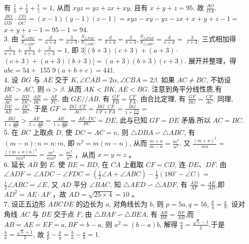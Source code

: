 \documentclass[10pt]{article}
\begin{document}
有 $\frac{1}{x}+\frac{1}{y}+\frac{1}{z}=1$, 从而 $x y z=y z+z x+x y$, 且有 $x+y+z=95$. 故 $\frac{A O}{O A}$. $\frac{B O}{O B^{\prime}} \cdot \frac{C O}{O C^{\prime}}=(x-1)(y-1)(z-1)=x y z-x y-y z-z x+x+y+z-1=$ $x+y+z-1=95-1=94$.\\
3. 由 $\frac{S_{\triangle P B C}}{S_{\triangle A B C}}=\frac{d}{a+d}=\frac{3}{a+3}, \frac{S_{\triangle P A C}}{S_{\triangle A B C}}=\frac{d}{b+d}=\frac{3}{b+3}, \frac{S_{\triangle P A B}}{S_{\triangle A B C}}=\frac{d}{c+d}=$ $\frac{3}{c+3}$. 三式相加得 $\frac{3}{a+3}+\frac{3}{b+3}+\frac{3}{c+3}=1$, 即 $3[(b+3)(c+3)+(a+3) \cdot$ $(c+3)+(a+3)(b+3)]=(a+3)(b+3)(c+3)$. 展开并整理，得 $a b c=54+$ 155 $9(a+b+c)=441$.\\
4. 设 $B G$ 与 $A E$ 交于 $K, \angle C A B=2 \alpha, \angle C B A=2 \beta$. 如果 $A C \neq B C$, 不妨设 $B C>A C$, 则 $\alpha>\beta$. 从而 $A K<B K, A E<B G$. 注意到角平分线性质,有 $\frac{A B}{A C}=\frac{B D}{D C}, \frac{A B}{B C}=\frac{A F}{F C}$. 由 $G E / / A B$, 有 $\frac{G F}{F B}=\frac{C F}{F A}$, 由合比定理, 有 $\frac{G F}{B G}=\frac{C F}{A C}$. 同理, $\frac{D E}{A E}=\frac{D C}{B C}$. 于是 $G F=\frac{B G \cdot C F}{A C}=\frac{B G \cdot C F}{C F+F A}=\frac{B G}{1+\frac{F A}{C F}}=$ $\frac{B G}{1+\frac{A B}{B C}}>\frac{A E}{1+\frac{A B}{A C}}=\frac{A E}{1+\frac{B D}{D C}}=\frac{A E \cdot D C}{B C}=D E$, 此与已知 $G F=D E$ 矛盾.所以 $A C=B C$.\\
5. 在 $B C$ 上取点 $D$, 使 $D C=A C=n$, 则 $\triangle D B A \backsim \triangle A B C$, 有 $(m-n): n=n: m$, 即 $n^{2}=m(m-n)$, 从而 $\frac{m+n}{m-n}=\frac{m^{3}}{n^{3}}$. 又 $\frac{(m+n)^{2}}{m n}=$ $\frac{[(m+n) n]^{2}}{m n^{3}}=\frac{m^{4}}{m n^{3}}=\frac{m^{3}}{n^{3}}$ ，从而 $x=y=z$ 。\\
6. 延长 $A B$ 到 $E$. 使 $B E=B D$, 在 $C A$ 上截取 $C F=C D$, 连 $D E 、 D F$. 由\\
$\angle A D F=\angle A D C-\angle F D C=\left(\frac{1}{2} \angle A+\angle A B C\right)-\frac{1}{2}\left(180^{\circ}-\angle C\right)=$ $\frac{1}{2} \angle A B C=\angle E$, 又 $A D$ 平分 $\angle B A C$, 知 $\triangle A E D \backsim \triangle A D F$, 有 $\frac{A D}{A F}=\frac{A E}{A D}$,即 $A D^{2}=A E \cdot A F$ ，故 $A D=\sqrt{25 \times 4}=10$ 。\\
7. 设正五边形 $A B C D E$ 的边长为 $a$, 对角线长为 $b$, 则 $p=5 a, q=5 b$, $\frac{p}{q}=\frac{a}{b}$. 设对角线 $A C$ 与 $B E$ 交于点 $F$, 由 $\triangle B A F \backsim \triangle B E A$, 有 $\frac{A B}{B E}=\frac{B F}{A B}$,而 $A B=A E=E F=a, B F=b-a$, 则 $a^{2}=(b-a) b$, 解得 $\frac{a}{b}=\frac{\sqrt{5}-1}{2}$.于是 $\frac{b}{a}=\frac{\sqrt{5}+1}{2}$, 故 $\frac{q}{p}-\frac{p}{q}=\frac{b}{a}-\frac{a}{b}=1$.\\
\end{document}
